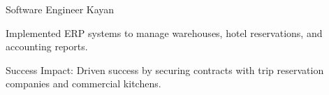 

\begin{cventries}

  \cventry
    {Software Engineer} %
    {Kayan} %
    {} %
    {} %
    {
      \begin{cvitems} %
        \item {Implemented ERP systems to manage warehouses, hotel reservations, and accounting reports.}
        \item {Success Impact: Driven success by securing contracts with trip reservation companies and commercial kitchens.}
      \end{cvitems}
    }

\end{cventries}
